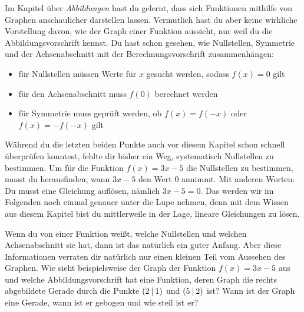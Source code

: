 \documentclass[../../main.tex]{subfiles}
\begin{document}
Im Kapitel über \emph{Abbildungen} hast du gelernt, dass sich Funktionen mithilfe von Graphen anschaulicher darstellen lassen. Vermutlich hast du aber keine wirkliche Vorstellung davon, wie der Graph einer Funktion aussieht, nur weil du die Abbildungsvorschrift kennst. Du hast schon gesehen, wie Nullstellen, Symmetrie und der Achsenabschnitt mit der Berechnungsvorschrift zusammenhängen:
\begin{itemize}
    \item für Nullstellen müssen Werte für $x$ gesucht werden, sodass $f(x)=0$ gilt
    \item für den Achsenabschnitt muss $f(0)$ berechnet werden
    \item für Symmetrie muss geprüft werden, ob $f(x)=f(-x)$ oder $f(x)=-f(-x)$ gilt
\end{itemize}
Während du die letzten beiden Punkte auch vor diesem Kapitel schon schnell überprüfen konntest, fehlte dir bisher ein Weg, systematisch Nullstellen zu bestimmen. Um für die Funktion $f(x)=3x-5$ die Nullstellen zu bestimmen, musst du herausfinden, wann $3x-5$ den Wert $0$ annimmt. Mit anderen Worten: Du musst eine Gleichung auflösen, nämlich $3x-5=0$. Das werden wir im Folgenden noch einmal genauer unter die Lupe nehmen, denn mit dem Wissen aus diesem Kapitel bist du mittlerweile in der Lage, lineare Gleichungen zu lösen.


Wenn du von einer Funktion weißt, welche Nullstellen und welchen Achsenabschnitt sie hat, dann ist das natürlich ein guter Anfang. Aber diese Informationen verraten dir natürlich nur einen kleinen Teil vom Aussehen des Graphen. 
Wie sieht beispielsweise der Graph der Funktion $f(x)=3x-5$ aus und welche Abbildungsvorschrift hat eine Funktion, deren Graph die rechts abgebildete Gerade durch die Punkte $\left(2 \:\middle|\: 1\right)$ und $\left(5 \:\middle|\: 2\right)$ ist? Wann ist der Graph eine Gerade, wann ist er gebogen und wie steil ist er?
\end{document}
